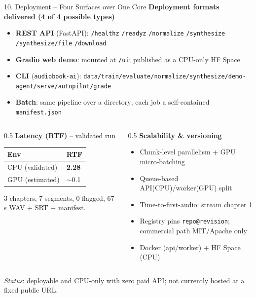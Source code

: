 \documentclass[10pt,aspectratio=169]{beamer}
\begin{document}
\begin{frame}{10. Deployment -- Four Surfaces over One Core}
\textbf{Deployment formats delivered (4 of 4 possible types)}
\begin{itemize}\small
  \item \textbf{REST API} (FastAPI): \texttt{/healthz} \texttt{/readyz} \texttt{/normalize} \texttt{/synthesize} \texttt{/synthesize/file} \texttt{/download}
  \item \textbf{Gradio web demo}: mounted at \texttt{/ui}; published as a CPU-only HF Space
  \item \textbf{CLI} (\texttt{audiobook-ai}): \texttt{data/train/evaluate/normalize/synthesize/demo-agent/serve/autopilot/grade}
  \item \textbf{Batch}: same pipeline over a directory; each job a self-contained \texttt{manifest.json}
\end{itemize}

\begin{columns}[T]
\begin{column}{0.5\textwidth}
\textbf{Latency (RTF)} -- validated run
\begin{table}[h]
\centering\small
\begin{tabular}{ll}
\toprule
\textbf{Env} & \textbf{RTF} \\
\midrule
CPU (validated) & \textbf{2.28} \\
GPU (estimated) & $\sim$0.1 \\
\bottomrule
\end{tabular}
\end{table}
\scriptsize 3 chapters, 7 segments, 0 flagged, 67\,s WAV + SRT + manifest.
\end{column}
\begin{column}{0.5\textwidth}
\textbf{Scalability \& versioning}
\begin{itemize}\scriptsize
  \item Chunk-level parallelism + GPU micro-batching
  \item Queue-based API(CPU)/worker(GPU) split
  \item Time-to-first-audio: stream chapter 1
  \item Registry pins \texttt{repo@revision}; commercial path MIT/Apache only
  \item Docker (api/worker) + HF Space (CPU)
\end{itemize}
\end{column}
\end{columns}

\vspace{0.1cm}
\scriptsize \textit{Status}: deployable and CPU-only with zero paid API; not currently hosted at a fixed public URL.
\end{frame}
\end{document}
